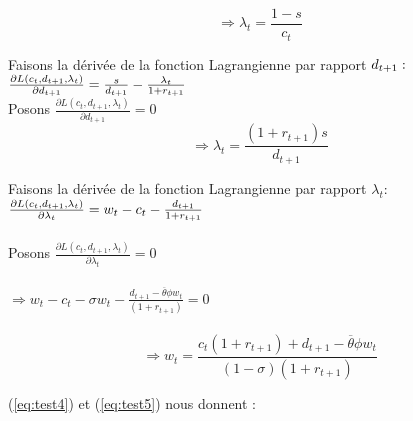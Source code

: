 \documentclass[11pt,twoside,a4paper]{article}
\begin{document}
\begin{equation}\label{eq:test4}
  \Rightarrow \lambda_t=\frac{1-s}{c_t}
\end{equation} 


Faisons la dérivée de la fonction Lagrangienne par rapport $d_{t+1} : \\ $
$\\
\frac{\partial L(c_t,d_{t+1},\lambda_t)}{\partial d_{t+1}} = \frac{s}{ d_{t+1}} - \frac{\lambda_t}{1+r_{t+1}} 
$\\

Posons  $ \frac{\partial L(c_t,d_{t+1},\lambda_t)}{\partial d_{t+1}} = 0 $ \\



  \begin{equation}\label{eq:test5}
  \Rightarrow \lambda_t=\frac{(1+r_{t+1})s}{ d_{t+1}}
\end{equation}  

Faisons la dérivée de la fonction Lagrangienne par rapport $\lambda_t :  $ \\
$\\
\frac{\partial L(c_t,d_{t+1},\lambda_t)}{\partial \lambda_t} = w_t-c_t - \frac{d_{t+1}}{1+r_{t+1}} 
$ \\ \\
Posons  $ \frac{\partial L(c_t,d_{t+1},\lambda_t)}{\partial \lambda_t} = 0 $ \\ \\
$\Rightarrow w_t-c_t - \sigma w_t-\frac{d_{t+1}-\overline{\theta}\phi w_t}{(1+r_{t+1})}=0$\\ \\
 \begin{equation}\label{eq:test6}
  \Rightarrow w_t = \frac{c_t(1+r_{t+1}) + d_{t+1}-\overline{\theta}\phi w_t}{(1-\sigma)(1+r_{t+1})}
\end{equation}
    

(\ref{eq:test4}) et (\ref{eq:test5}) nous donnent : \\
\end{document}
